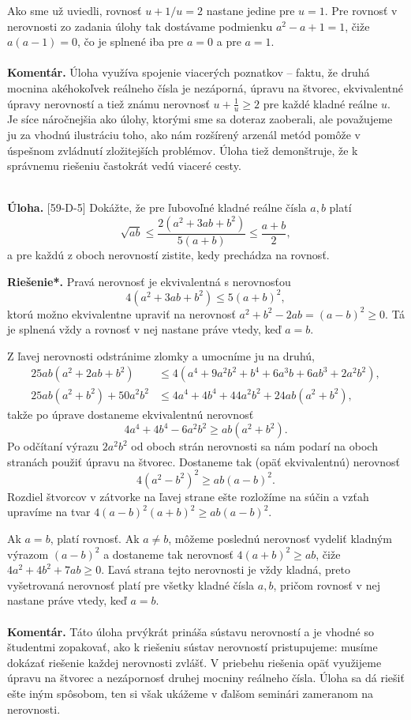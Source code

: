 \documentclass[11pt,a4paper,oneside,final]{book}
\newcommand{\kom}{\textbf{Komentár.} }
\newcommand{\ul}{\textbf{Úloha.} }
\newcommand{\rieh}{\textbf{Riešenie*.} }
\begin{document}
Ako sme už uviedli, rovnosť $u + 1/u = 2$ nastane jedine pre $u = 1$. Pre rovnosť v nerovnosti zo zadania úlohy tak dostávame podmienku $a^2 -a+1 = 1$, čiže $a(a-1)= 0$, čo je splnené iba pre $a = 0$ a pre $a = 1$.\\
\\
\kom Úloha využíva spojenie viacerých poznatkov -- faktu, že druhá mocnina akéhokoľvek reálneho čísla je nezáporná, úpravu na štvorec, ekvivalentné úpravy nerovností a tiež známu nerovnosť $u+\frac{1}{u} \geq 2$ pre každé kladné reálne $u$. Je síce náročnejšia ako úlohy, ktorými sme sa doteraz zaoberali, ale považujeme ju za vhodnú ilustráciu toho, ako nám rozšírený arzenál metód pomôže v úspešnom zvládnutí zložitejších problémov. Úloha tiež demonštruje, že k správnemu riešeniu častokrát vedú viaceré cesty.\\
\\
\begin{tcolorbox}[breakable,notitle,boxrule=0pt,colback=light-gray,colframe=light-gray]\ul [59-D-5] Dokážte, že pre ľubovoľné kladné reálne čísla $a, b$ platí
$$ \sqrt{ab}\leq \frac{2(a^2+3ab+b^2)}{5(a+b)}\leq \frac{a+b}{2},$$
a pre každú z oboch nerovností zistite, kedy prechádza na rovnosť.

\end{tcolorbox}

\rieh Pravá nerovnosť je ekvivalentná s nerovnosťou
$$ 4(a^2 + 3ab + b^2 ) \leq 5(a + b)^2,$$
ktorú možno ekvivalentne upraviť na nerovnosť $a^2 + b^2 - 2ab = (a - b)^2 \geq 0$. Tá je splnená vždy a rovnosť v nej nastane práve vtedy, keď $a = b$.

Z ľavej nerovnosti odstránime zlomky a umocníme ju na druhú,
\begin{align*}
25ab(a^2 + 2ab + b^2) &\leq 4(a^4 + 9a^2 b^2 + b^4 + 6a^3 b + 6ab^3 + 2a^2 b^2),\\
25ab(a^2 + b^2 ) + 50a^2 b^2 &\leq 4a^4 + 4b^4 + 44a^2 b^2 + 24ab(a^2 + b^2 ),
\end{align*}
takže po úprave dostaneme ekvivalentnú nerovnosť
$$4a^4 + 4b^4 - 6a^2 b^2 \geq ab(a^2 + b^2 ).$$
Po odčítaní výrazu $2a^2 b^2$ od oboch strán nerovnosti sa nám podarí na oboch stranách použiť úpravu na štvorec. Dostaneme tak (opäť ekvivalentnú) nerovnosť $$ 4(a^2 - b^2 )^2 \geq ab(a - b)^2.$$
Rozdiel štvorcov v zátvorke na ľavej strane ešte rozložíme na súčin a vzťah upravíme
na tvar $4(a - b)^2 (a + b)^2 \geq ab(a - b)^2$.

Ak $a = b$, platí rovnosť. Ak $a \neq b$, môžeme poslednú nerovnosť vydeliť kladným výrazom $(a - b)^2$ a dostaneme tak nerovnosť $4(a + b)^2 \geq ab$, čiže $4a^2 + 4b^2 + 7ab \geq 0$. Ľavá strana tejto nerovnosti je vždy kladná, preto vyšetrovaná nerovnosť platí pre všetky kladné čísla $a, b$, pričom rovnosť v nej nastane práve vtedy, keď $a = b$.\\
\\
\kom Táto úloha prvýkrát prináša sústavu nerovností a je vhodné so študentmi zopakovať, ako k riešeniu sústav nerovností pristupujeme: musíme dokázať riešenie každej nerovnosti zvlášť. V priebehu riešenia opäť využijeme úpravu na štvorec a nezápornosť druhej mocniny reálneho čísla. Úloha sa dá riešiť ešte iným spôsobom, ten si však ukážeme v ďalšom seminári zameranom na nerovnosti.
\end{document}
